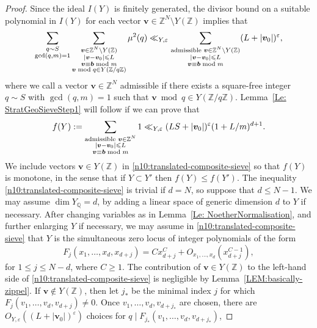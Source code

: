 \documentclass[a4paper,11pt, twoside,reqno]{amsart}
\theoremstyle{plain}
\theoremstyle{definition}
\theoremstyle{remark}
\newcommand{\bfb}{\bm{b}}
\newcommand{\bfv}{\bm{v}}
\newcommand{\ZZ}{\mathbb{Z}}
\newcommand{\QQ}{\mathbb{Q}}
\newcommand{\ve}{\varepsilon}
\renewcommand{\le}{\leqslant}
\renewcommand{\ge}{\geqslant}
\numberwithin{equation}{section}
\begin{document}
\begin{proof}
Since the ideal $I(Y)$ is finitely generated,
the divisor bound on a suitable polynomial in $I(Y)$
for each vector $\bfv\in \ZZ^N \setminus Y(\ZZ)$
implies that
\begin{equation*}
\sum_{\substack{q\sim S \\
\gcd(q,m)=1}}
\sum_{\substack{\bfv\in \ZZ^N \setminus Y(\ZZ) \\
|\bfv-\bfv_0|\le L \\
\bfv\equiv\bfb\bmod m \\
\bfv\bmod q\in Y(\ZZ/q\ZZ)}}
\mu^2(q)
\ll_{Y,\ve}
\sum_{\substack{\textnormal{admissible }\bfv\in \ZZ^N \setminus Y(\ZZ) \\
|\bfv-\bfv_0|\le L \\
\bfv\equiv\bfb\bmod m}} (L+|\bfv_0|)^\ve,
\end{equation*}
where we call a vector $\bfv\in \ZZ^N$
admissible if there exists a square-free integer $q\sim S$
with $\gcd(q,m)=1$
such that $\bfv\bmod q\in Y(\ZZ/q\ZZ)$.
Lemma~\ref{Le: StratGeoSieveStep1} will follow if we can prove that
\begin{equation}
\label{n10:translated-composite-sieve}
f(Y) := \sum_{\substack{\textnormal{admissible }\bfv\in \ZZ^N \\
|\bfv-\bfv_0|\le L \\
\bfv\equiv\bfb\bmod m}} 1
\ll_{Y,\ve} (LS+|\bfv_0|)^\ve (1 + L/m)^{d+1}.
\end{equation}
We include vectors $\bfv\in Y(\ZZ)$ in \eqref{n10:translated-composite-sieve}
so that $f(Y)$ is monotone, in the sense that if $Y \subset Y'$ then $f(Y) \le f(Y')$.
The inequality \eqref{n10:translated-composite-sieve}
is trivial if $d=N$, so suppose that $d\le N-1$.
We may assume $\dim Y_\QQ = d$,
by adding a linear space of generic dimension $d$
to $Y$ if necessary.
After changing variables as in Lemma~\ref{Le: NoetherNormalisation},
and further enlarging $Y$ if necessary,
we may assume in \eqref{n10:translated-composite-sieve}
that $Y$ is the simultaneous zero locus
of integer polynomials of the form
$$F_j(x_1,\dots,x_d,x_{d+j}) = Cx_{d+j}^C + O_{x_1,\dots,x_d}(x_{d+j}^{C-1}),$$
for $1\le j\le N-d$,
where $C\ge 1$.
The contribution of $\bfv\in Y(\ZZ)$ to the left-hand side of
\eqref{n10:translated-composite-sieve}
is negligible by Lemma~\ref{LEM:basically-zippel}.
If $\bfv\notin Y(\ZZ)$, then let $j_*$ be the minimal index $j$
for which $F_j(v_1,\dots,v_d,v_{d+j}) \ne 0$.
Once $v_1,\dots,v_d,v_{d+j_*}$ are chosen,
there are
$O_{Y,\ve}((L+|\bfv_0|)^\ve)$ choices for $q\mid F_{j_*}(v_1,\dots,v_d,v_{d+j_*})$,

\end{proof}
\end{document}
